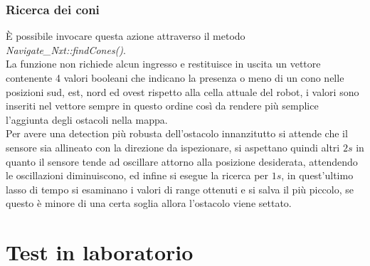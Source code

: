 \documentclass[english]{article}
\newcommand*{\eacc}{\MakeUppercase{è }}
\begin{document}
\subsubsection{Ricerca dei coni}
\eacc possibile invocare questa azione attraverso il metodo  \textit{Navigate\_Nxt::findCones()}.\\
La funzione non richiede alcun ingresso e restituisce in uscita un vettore contenente 4 valori booleani che indicano la presenza o meno di un cono nelle posizioni sud, est, nord ed ovest rispetto alla cella attuale del robot, i valori sono inseriti nel vettore sempre in questo ordine così da rendere più semplice l'aggiunta degli ostacoli nella mappa.\\
Per avere una detection più robusta dell'ostacolo innanzitutto si attende che il sensore sia allineato con la direzione da ispezionare, si aspettano quindi altri $2s$ in quanto il sensore tende ad oscillare attorno alla posizione desiderata, attendendo le oscillazioni diminuiscono, ed infine si esegue la ricerca per $1s$, in quest'ultimo lasso di tempo si esaminano i valori di range ottenuti e si salva il più piccolo, se questo è minore di una certa soglia allora l'ostacolo viene settato.


\section{Test in laboratorio}
\end{document}
